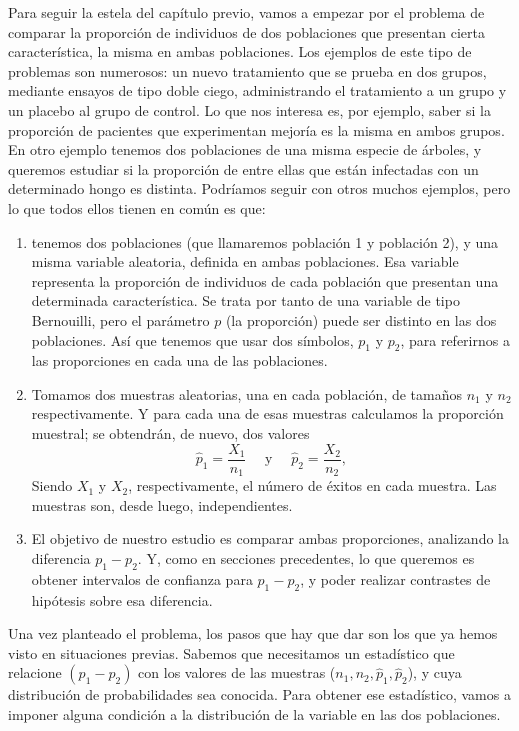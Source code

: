 Para seguir la estela del capítulo previo, vamos a empezar por el problema de comparar la
proporción de individuos de dos poblaciones que presentan cierta característica, la misma en ambas
poblaciones. Los ejemplos de este tipo de problemas son numerosos: un nuevo tratamiento que se
prueba en dos grupos, mediante ensayos de tipo doble ciego, administrando el tratamiento a un grupo
y un placebo al grupo de control. Lo que nos interesa es, por ejemplo, saber si la proporción de
pacientes que experimentan mejoría es la misma en ambos grupos. En otro ejemplo tenemos dos
poblaciones de una misma especie de árboles, y queremos estudiar si la proporción de entre ellas
que están infectadas con un determinado hongo es distinta. Podríamos seguir con otros muchos
ejemplos, pero lo que todos ellos tienen en común es que:
\begin{enumerate}
            \item tenemos dos poblaciones (que llamaremos población 1 y población 2), y una misma
                variable aleatoria, definida en ambas poblaciones. Esa variable representa la
                proporción de individuos de cada población que presentan una determinada
                característica. Se trata por tanto de una variable de tipo Bernouilli, pero el
                parámetro $p$ (la proporción) puede ser distinto en las dos poblaciones. Así que
                tenemos que usar dos símbolos, $p_1$ y $p_2$, para referirnos a las proporciones
                en cada una de las poblaciones.
            \item Tomamos dos muestras aleatorias, una en cada población, de tamaños $n_1$ y
                $n_2$ respectivamente. Y para cada una de esas muestras calculamos la proporción
                muestral; se obtendrán, de nuevo, dos valores
                \[\hat p_1=\dfrac{X_1}{n_1}\quad \mbox{ y }\quad \hat p_2=\dfrac{X_2}{n_2},\]
                Siendo $X_1$ y $X_2$, respectivamente, el número de éxitos en cada muestra. Las
                muestras son, desde luego, independientes.
            \item El objetivo de nuestro estudio es comparar ambas proporciones, analizando la diferencia $p_1-p_2$. Y, como en secciones precedentes, lo que queremos es obtener intervalos de confianza para $p_1-p_2$, y poder realizar contrastes de hipótesis sobre esa diferencia.
\end{enumerate}
Una vez planteado el problema, los pasos que hay que dar son los que ya hemos visto en situaciones
previas. Sabemos que necesitamos un estadístico que relacione $(p_1-p_2)$ con los valores de las
muestras ($n_1, n_2, \hat p_1, \hat p_2$), y cuya distribución de probabilidades sea conocida. Para
obtener ese estadístico, vamos a imponer alguna condición a la distribución de la variable en las
dos poblaciones.

